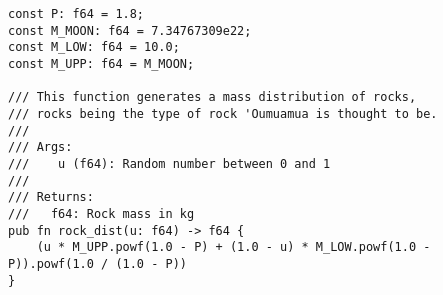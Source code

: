 \begin{lstlisting}
const P: f64 = 1.8;
const M_MOON: f64 = 7.34767309e22;
const M_LOW: f64 = 10.0;
const M_UPP: f64 = M_MOON;

/// This function generates a mass distribution of rocks,
/// rocks being the type of rock 'Oumuamua is thought to be.
///
/// Args:
///    u (f64): Random number between 0 and 1
///
/// Returns:
///   f64: Rock mass in kg
pub fn rock_dist(u: f64) -> f64 {
    (u * M_UPP.powf(1.0 - P) + (1.0 - u) * M_LOW.powf(1.0 - P)).powf(1.0 / (1.0 - P))
}
\end{lstlisting}